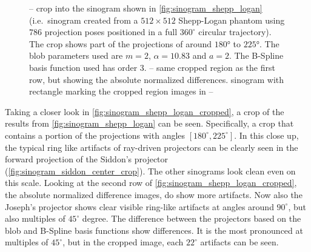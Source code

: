 \begin{figure}
	\caption{--
		crop into the sinogram shown in \autoref{fig:sinogram_shepp_logan} (i.e.\ sinogram
		created from a \(512 \times 512\) Shepp-Logan phantom using \(786\) projection poses
		positioned in a full \(360^\circ\) circular trajectory). The crop shows part of the
		projections of around \(180\)° to \(225\)°. The blob parameters used are \(m=2\),
		\(\alpha=10.83\) and \(a=2\). The B-Spline basis function used has order \(3\).
		--
		same cropped region as the first row, but showing the absolute normalized
		differences.  sinogram with rectangle marking the
		cropped region images in
		--
	}
	\label{fig:sinogram_shepp_logan_cropped}
\end{figure}

Taking a closer look in \autoref{fig:sinogram_shepp_logan_cropped}, a crop of the results from
\autoref{fig:sinogram_shepp_logan} can be seen. Specifically, a crop that contains a portion of the
projections with angles \([180^\circ, 225^\circ]\). In this close up, the typical ring like
artifacts
of ray-driven projectors can be clearly seen in the forward projection of the Siddon's projector
(\autoref{fig:sinogram_siddon_center_crop}). The other sinograms look clean even on this scale.
Looking at the second row of \autoref{fig:sinogram_shepp_logan_cropped}, the absolute normalized
difference images, do show more artifacts. Now also the Joseph's projector shows clear visible
ring-like artifacts at angles around \(90^\circ\), but also multiples of \(45^\circ\) degree.
The difference between the projectors based on the blob and B-Spline basis functions show
differences. It is the most pronounced at multiples of \(45^\circ\), but in the cropped image, each
\(22^\circ\) artifacts can be seen.


